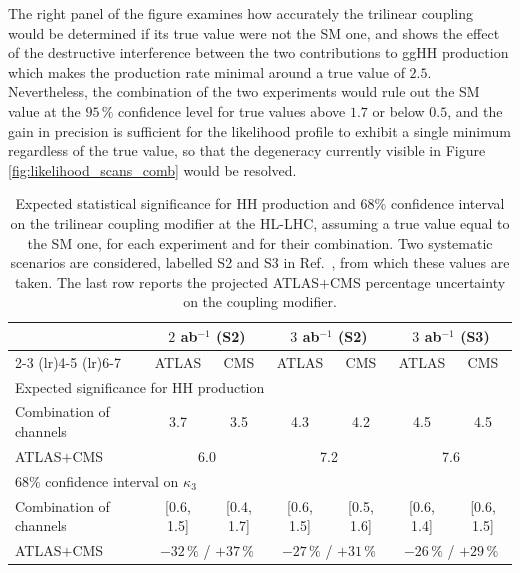 The right panel of the figure examines how accurately the trilinear coupling would be determined if its true value were not the SM one, and shows the effect of the destructive interference between the two contributions to ggHH production which makes the production rate minimal around a true value of $2.5$. Nevertheless, the combination of the two experiments would rule out the SM value at the $95\,\%$ confidence level for true values above $1.7$ or below $0.5$, and the gain in precision is sufficient for the likelihood profile to exhibit a single minimum regardless of the true value, so that the degeneracy currently visible in Figure \ref{fig:likelihood_scans_comb} would be resolved.
%
\begin{table}[t]
\centering
\begin{tabular}{lcccccc}
\toprule
 & \multicolumn{2}{c}{$2$ ab$^{-1}$ (S2)} & \multicolumn{2}{c}{$3$ ab$^{-1}$ (S2)} & \multicolumn{2}{c}{$3$ ab$^{-1}$ (S3)} \\
\cmidrule(lr){2-3} \cmidrule(lr){4-5} \cmidrule(lr){6-7}
 & ATLAS & CMS & ATLAS & CMS & ATLAS & CMS \\
\midrule
\midrule
\multicolumn{7}{l}{Expected significance for HH production} \\
\midrule
Combination of channels & 3.7 & 3.5 & 4.3 & 4.2 & 4.5 & 4.5 \\
ATLAS$+$CMS             & \multicolumn{2}{c}{6.0} & \multicolumn{2}{c}{7.2} & \multicolumn{2}{c}{7.6} \\
\midrule
\multicolumn{7}{l}{$68\%$ confidence interval on $\kappa_3$} \\
\midrule
Combination of channels & [0.6, 1.5] & [0.4, 1.7] & [0.6, 1.5] & [0.5, 1.6] & [0.6, 1.4] & [0.6, 1.5] \\
ATLAS$+$CMS             & \multicolumn{2}{c}{$-32\,\%$ / $+37\,\%$} & \multicolumn{2}{c}{$-27\,\%$ / $+31\,\%$} & \multicolumn{2}{c}{$-26\,\%$ / $+29\,\%$} \\
\bottomrule
\end{tabular}
\caption[HL-LHC projections for HH production and the trilinear coupling]{%
Expected statistical significance for HH production and $68\%$ confidence interval on
the trilinear coupling modifier at the HL-LHC, assuming a true value equal to the SM
one, for each experiment and for their combination. Two systematic scenarios are
considered, labelled S2 and S3 in Ref.~\cite{ATLASCMS:2025HLLHC}, from which these
values are taken. The last row reports the projected ATLAS$+$CMS percentage
uncertainty on the coupling modifier.}
\label{tab:hllhc_projections}
\end{table}

